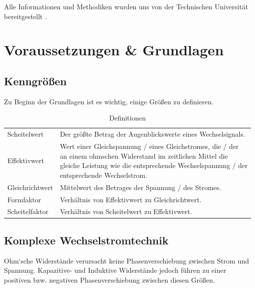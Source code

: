 \documentclass[12pt,a4paper,twoside]{article}
\begin{document}
\noindent
Alle Informationen und Methodiken wurden uns von der Technischen Universität bereitgestellt \cite{teachcenter2}. 



\section{Voraussetzungen \& Grundlagen} %

\subsection{Kenngrößen}

Zu Beginn der Grundlagen ist es wichtig, einige Größen zu definieren.

\begin{table}[H]
    \centering
    \caption{Definitionen \cite{teachcenter2}}
    \label{tab:definitionen}
    \begin{tabular}{| l | l |}
        \hline
        Scheitelwert & Der größte Betrag der Augenblickswerte eines Wechselsignals. \\
        Effektivwert & Wert einer Gleichspannung / eines Gleichstromes, die / der an einem ohmschen \newline 
        Widerstand im zeitlichen Mittel die gleiche Leistung wie die entsprechende Wechselspannung \newline
        / der entsprechende Wechselstrom. \\
        Gleichrichtwert & Mittelwert des Betrages der Spannung / des Stromes. \\
        Formfaktor & Verhältnis von Effektivwert zu Gleichrichtwert. \\
        Scheitelfaktor & Verhältnis von Scheitelwert zu Effektivwert. \\
        \hline
    \end{tabular}
\end{table}

\subsection{Komplexe Wechselstromtechnik}



Ohm`sche Widerstände verursacht keine Phasenverschiebung zwischen Strom und Spannung. Kapazitive- und Induktive Widerstände jedoch führen zu einer positiven bzw. negativen Phasenverschiebung zwischen diesen Größen.
\end{document}
